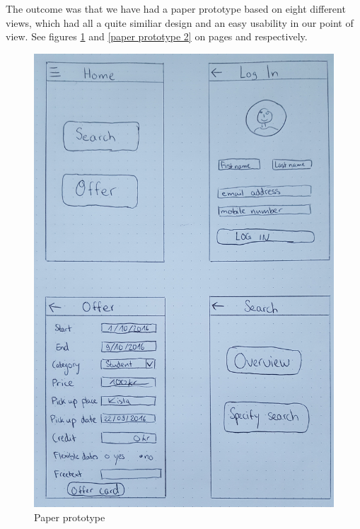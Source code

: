 \documentclass[11pt,twoside,a4paper]{report}
\begin{document}
The outcome was that we have had a paper prototype based on eight different views, which had all a quite similiar design and an easy usability in our point of view. See figures \ref{paper prototype 1} and \ref{paper prototype 2} on pages \pageref{paper prototype 1} and \pageref{paper prototype 2} respectively.

\begin{figure}
	\centering
	\includegraphics[width=\textwidth]{Paper_prototype1.jpg}
	\caption{Paper prototype}
	\label{paper prototype 1}
\end{figure}
\end{document}
